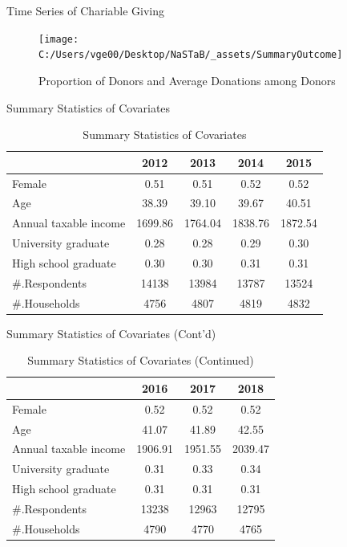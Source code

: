 \documentclass[
  ignorenonframetext,
]{beamer}
\begin{document}
\begin{frame}{Time Series of Chariable Giving}
\protect\hypertarget{time-series-of-chariable-giving}{}
\begin{figure}
\texttt{[image: C:/Users/vge00/Desktop/NaSTaB/\_assets/SummaryOutcome]} \caption{Proportion of Donors and Average Donations among Donors}\label{fig:unnamed-chunk-1}
\end{figure}
\end{frame}

\begin{frame}{Summary Statistics of Covariates}
\protect\hypertarget{summary-statistics-of-covariates}{}
\begin{table}

\caption{\label{tab:kableSummaryCovariate}Summary Statistics of Covariates}
\centering
\begin{tabular}[t]{lcccc}
\toprule
 & 2012 & 2013 & 2014 & 2015\\
\midrule
Female & 0.51 & 0.51 & 0.52 & 0.52\\
Age & 38.39 & 39.10 & 39.67 & 40.51\\
Annual taxable income & 1699.86 & 1764.04 & 1838.76 & 1872.54\\
University graduate & 0.28 & 0.28 & 0.29 & 0.30\\
High school graduate & 0.30 & 0.30 & 0.31 & 0.31\\
\#.Respondents & 14138 & 13984 & 13787 & 13524\\
\#.Households & 4756 & 4807 & 4819 & 4832\\
\bottomrule
\end{tabular}
\end{table}
\end{frame}

\begin{frame}{Summary Statistics of Covariates (Cont'd)}
\protect\hypertarget{summary-statistics-of-covariates-contd}{}
\begin{table}

\caption{\label{tab:kableSummaryCovariate2}Summary Statistics of Covariates (Continued)}
\centering
\begin{tabular}[t]{lccc}
\toprule
 & 2016 & 2017 & 2018\\
\midrule
Female & 0.52 & 0.52 & 0.52\\
Age & 41.07 & 41.89 & 42.55\\
Annual taxable income & 1906.91 & 1951.55 & 2039.47\\
University graduate & 0.31 & 0.33 & 0.34\\
High school graduate & 0.31 & 0.31 & 0.31\\
\#.Respondents & 13238 & 12963 & 12795\\
\#.Households & 4790 & 4770 & 4765\\
\bottomrule
\end{tabular}
\end{table}
\end{frame}
\end{document}
